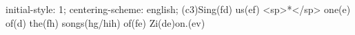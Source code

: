 initial-style: 1;
centering-scheme: english;
(c3)Sing(fd) us(ef) <sp>*</sp> one(e) of(d) the(fh) songs(hg/hih) of(fe) Zi(de)on.(ev)
